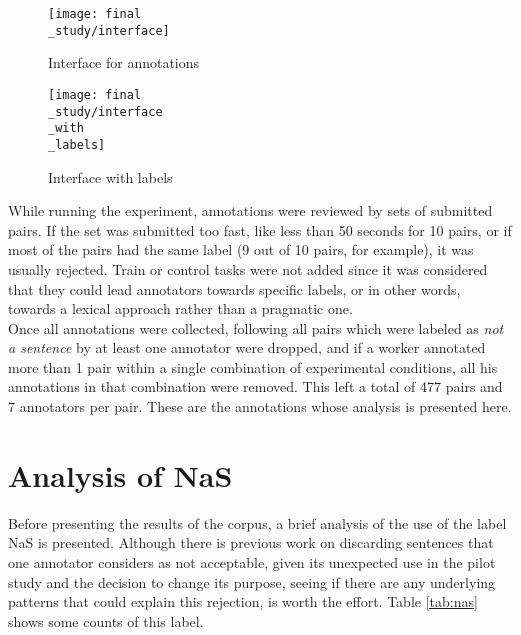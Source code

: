 \begin{figure}
\centering
\parbox{5cm}{\texttt{[image: final\\\_study/interface]}
\caption{Interface for annotations}\label{fig:int}}
\qquad
\begin{minipage}{5cm}
\texttt{[image: final\\\_study/interface\\\_with\\\_labels]}
\caption{Interface with labels}\label{fig:intlab}
\end{minipage}
\end{figure}

While running the experiment, annotations were reviewed by sets of submitted pairs. If the set was submitted too fast, like less than 50 seconds for 10 pairs, or if most of the pairs had the same label (9 out of 10 pairs, for example), it was usually rejected. Train or control tasks were not added since it was considered that they could lead annotators towards specific labels, or in other words, towards a lexical approach rather than a pragmatic one.\\

Once all annotations were collected, following \citet{pavlick2019inherent} all pairs which were labeled as \textit{not a sentence} by at least one annotator were dropped, and if a worker annotated more than 1 pair within a single combination of experimental conditions, all his annotations in that combination were removed. This left a total of 477 pairs and 7 annotators per pair. These are the annotations whose analysis is presented here.\\

\section{Analysis of NaS}
\label{sect:nas}
Before presenting the results of the corpus, a brief analysis of the use of the label NaS is presented. Although there is previous work on discarding sentences that one annotator considers as not acceptable, given its unexpected use in the pilot study and the decision to change its purpose, seeing if there are any underlying patterns that could explain this rejection, is worth the effort. Table \ref{tab:nas} shows some counts of this label.\\ 

